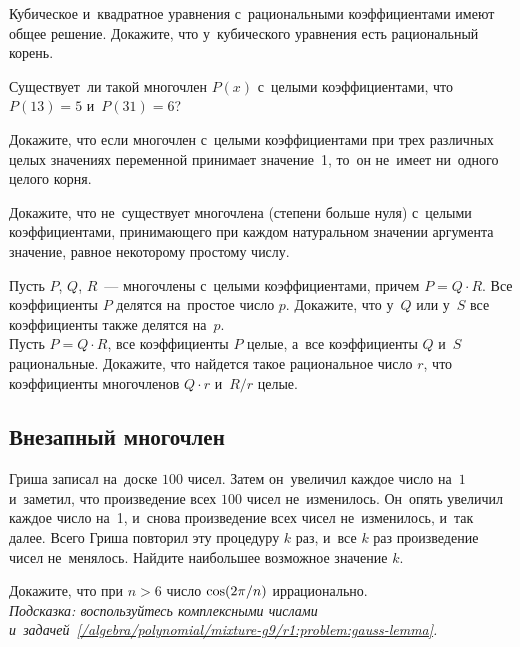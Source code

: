 \begin{problems}

\item
Кубическое и~квадратное уравнения с~рациональными коэффициентами имеют общее
решение.
Докажите, что у~кубического уравнения есть рациональный корень.

\item
Существует~ли такой многочлен $P(x)$ с~целыми коэффициентами, что
$P(13) = 5$ и~$P(31) = 6$?

\item
Докажите, что если многочлен с~целыми коэффициентами при трех различных целых
значениях переменной принимает значение~1, то~он не~имеет ни~одного целого
корня.

\item
Докажите, что не~существует многочлена (степени больше нуля) с~целыми
коэффициентами, принимающего при каждом натуральном значении аргумента
значение, равное некоторому простому числу.

\item
\label{/algebra/polynomial/mixture-g9/r1:problem:gauss-lemma}%
\subproblem
Пусть $P$, $Q$, $R$~--- многочлены с~целыми коэффициентами, причем
$P = Q \cdot R$.
Все коэффициенты $P$ делятся на~простое число $p$.
Докажите, что у~$Q$ или у~$S$ все коэффициенты также делятся на~$p$.
\\
\subproblem
Пусть $P = Q \cdot R$, все коэффициенты $P$ целые, а~все коэффициенты $Q$ и~$S$
рациональные.
Докажите, что найдется такое рациональное число $r$, что коэффициенты
многочленов $Q \cdot r$ и~$R / r$ целые.

\end{problems}

\subsection*{Внезапный многочлен}

\begin{problems}

\item
Гриша записал на~доске $100$ чисел.
Затем он~увеличил каждое число на~$1$ и~заметил, что произведение всех
$100$ чисел не~изменилось.
Он~опять увеличил каждое число на~1, и~снова произведение всех чисел
не~изменилось, и~так далее.
Всего Гриша повторил эту процедуру $k$ раз, и~все $k$ раз произведение чисел
не~менялось.
Найдите наибольшее возможное значение $k$.

\item
Докажите, что при $n > 6$ число $\cos(2 \mathrm{\pi} / n)$ иррационально.
\\\emph{Подсказка: воспользуйтесь комплексными числами
и~задачей~\ref{/algebra/polynomial/mixture-g9/r1:problem:gauss-lemma}.}

\end{problems}

\endgroup %

